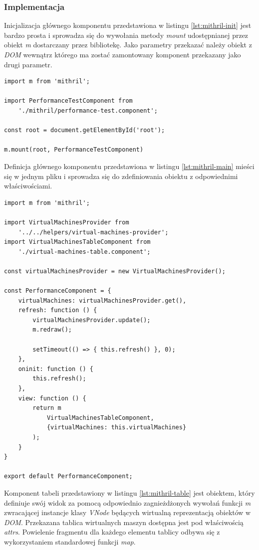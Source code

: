 \documentclass[polish, twoside, 12pt]{mwart}
\begin{document}
\subsubsection{Implementacja}

Inicjalizacja głównego komponentu przedstawiona w listingu \ref{lst:mithril-init} jest bardzo prosta i sprowadza się do wywołania metody \emph{mount} udostępnianej przez obiekt \emph{m} dostarczany przez bibliotekę. Jako parametry przekazać należy obiekt z \emph{DOM} wewnątrz którego ma zostać zamontowany komponent przekazany jako drugi parametr.

\begin{lstlisting}[caption=Inicjalizacja głównego komponentu, label={lst:mithril-init}]
import m from 'mithril';

import PerformanceTestComponent from
    './mithril/performance-test.component';

const root = document.getElementById('root');

m.mount(root, PerformanceTestComponent)
\end{lstlisting}

Definicja głównego komponentu przedstawiona w listingu \ref{lst:mithril-main} mieści się w jednym pliku i sprowadza się do zdefiniowania obiektu z odpowiednimi właściwościami.

\begin{lstlisting}[caption=Główny komponent, label={lst:mithril-main}]
import m from 'mithril';

import VirtualMachinesProvider from
    '../../helpers/virtual-machines-provider';
import VirtualMachinesTableComponent from
    './virtual-machines-table.component';

const virtualMachinesProvider = new VirtualMachinesProvider();

const PerformanceComponent = {
    virtualMachines: virtualMachinesProvider.get(),
    refresh: function () {
        virtualMachinesProvider.update();
        m.redraw();

        setTimeout(() => { this.refresh() }, 0);
    },
    oninit: function () {
        this.refresh();
    },
    view: function () {
        return m
            VirtualMachinesTableComponent,
            {virtualMachines: this.virtualMachines}
        );
    }
}

export default PerformanceComponent;
\end{lstlisting}

Komponent tabeli przedstawiony w listingu \ref{lst:mithril-table} jest obiektem, który definiuje swój widok za pomocą odpowiednio zagnieżdżonych wywołań funkcji \emph{m} zwracającej instancje klasy \emph{VNode} będących wirtualną reprezentacją obiektów w \emph{DOM}. Przekazana tablica wirtualnych maszyn dostępna jest pod właściwością \emph{attrs}. Powielenie fragmentu dla każdego elementu tablicy odbywa się z wykorzystaniem standardowej funkcji \emph{map}.
\end{document}
